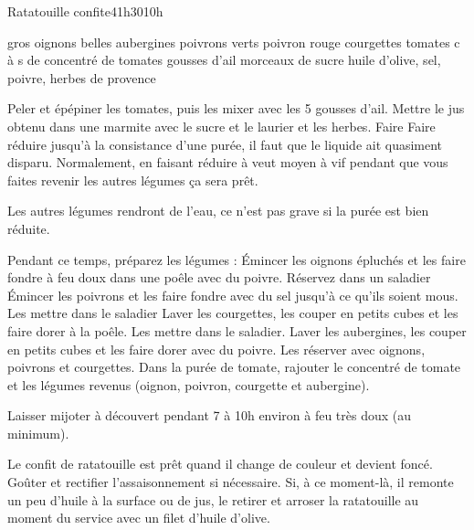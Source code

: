 \begin{recette}{Ratatouille confite}{4}{1h30}{10h}
\begin{ingredients}
 gros oignons
 belles aubergines
 poivrons verts
 poivron rouge
 courgettes
 tomates
 c à s de concentré de tomates
 gousses d'ail
 morceaux de sucre
\ingredient huile d'olive, sel, poivre, herbes de provence
\end{ingredients}

\begin{preparation}
\etape Peler et épépiner les tomates, puis les mixer avec les 5 gousses d'ail. Mettre le jus obtenu dans une marmite avec le sucre et le laurier et les herbes. 
\etape Faire Faire réduire jusqu'à la consistance d'une purée, il faut que le liquide ait quasiment disparu. Normalement, en faisant réduire à veut moyen à vif pendant que vous faites revenir les autres légumes ça sera prêt. 
\begin{remarque}
Les autres légumes rendront de l'eau, ce n'est pas grave si la purée est bien réduite.
\end{remarque}
\etape Pendant ce temps, préparez les légumes : 
\etape Émincer les oignons épluchés et les faire fondre à feu doux dans une poêle avec du poivre. Réservez dans un saladier
\etape Émincer les poivrons et les faire fondre avec du sel jusqu'à ce qu'ils soient mous. Les mettre dans le saladier
\etape Laver les courgettes, les couper en petits cubes et les faire dorer à la poêle. Les mettre dans le saladier.
\etape Laver les aubergines, les couper en petits cubes et les faire dorer avec du poivre. Les réserver avec oignons, poivrons et courgettes.
\etape Dans la purée de tomate, rajouter le concentré de tomate et les légumes revenus (oignon, poivron, courgette et aubergine).
\end{preparation}

\begin{cuisson}
Laisser mijoter à découvert pendant 7 à 10h environ à feu très doux (au minimum). 

Le confit de ratatouille est prêt quand il change de couleur et devient foncé. Goûter et rectifier l'assaisonnement si nécessaire. Si, à ce moment-là, il remonte un peu d'huile à la surface ou de jus, le retirer et arroser la ratatouille au moment du service avec un filet d'huile d'olive.
\end{cuisson}
\end{recette}

